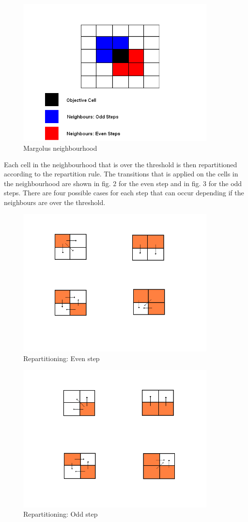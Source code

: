 \documentclass[a4paper,11pt,titlepage]{article}
\begin{document}
\begin{figure}[htbp]
   \centering
   \includegraphics[width=10cm]{bure.png}
   \caption{Margolus neighbourhood}
   \label{Figure:figex}
\end{figure}

Each cell in the neighbourhood that is over the threshold is then repartitioned according to the repartition rule. The transitions that is applied on the cells in the neighbourhood are shown in fig. 2 for the even step and in fig. 3 for the odd steps.
There are four possible cases for each step that can occur depending if the neighbours are over the threshold.
\begin{figure}[htbp]
   \centering
   \includegraphics[width=10cm]{even.png}
   \caption{Repartitioning: Even step}
   \label{Figure:figex}
\end{figure}
\begin{figure}[htbp]
   \centering
   \includegraphics[width=10cm]{odd.png}
   \caption{Repartitioning: Odd step}
   \label{Figure:figex}
\end{figure}
\end{document}
